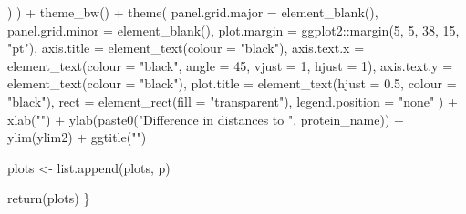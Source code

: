 \documentclass[
  11pt,
  oneside]{book}
\newenvironment{Shaded}{\begin{snugshade}}{\end{snugshade}}
\newcommand{\AttributeTok}[1]{\textcolor[rgb]{0.77,0.63,0.00}{#1}}
\newcommand{\DecValTok}[1]{\textcolor[rgb]{0.00,0.00,0.81}{#1}}
\newcommand{\FloatTok}[1]{\textcolor[rgb]{0.00,0.00,0.81}{#1}}
\newcommand{\FunctionTok}[1]{\textcolor[rgb]{0.00,0.00,0.00}{#1}}
\newcommand{\NormalTok}[1]{#1}
\newcommand{\OtherTok}[1]{\textcolor[rgb]{0.56,0.35,0.01}{#1}}
\newcommand{\SpecialCharTok}[1]{\textcolor[rgb]{0.00,0.00,0.00}{#1}}
\newcommand{\StringTok}[1]{\textcolor[rgb]{0.31,0.60,0.02}{#1}}
\begin{document}
\begin{Shaded}
\begin{Highlighting}[]
\NormalTok{      )}
\NormalTok{    ) }\SpecialCharTok{+}
    \FunctionTok{theme\_bw}\NormalTok{() }\SpecialCharTok{+}
    \FunctionTok{theme}\NormalTok{(}
      \AttributeTok{panel.grid.major =} \FunctionTok{element\_blank}\NormalTok{(),}
      \AttributeTok{panel.grid.minor =} \FunctionTok{element\_blank}\NormalTok{(),}
      \AttributeTok{plot.margin =}\NormalTok{ ggplot2}\SpecialCharTok{::}\FunctionTok{margin}\NormalTok{(}\DecValTok{5}\NormalTok{, }\DecValTok{5}\NormalTok{, }\DecValTok{38}\NormalTok{, }\DecValTok{15}\NormalTok{, }\StringTok{"pt"}\NormalTok{),}
      \AttributeTok{axis.title =} \FunctionTok{element\_text}\NormalTok{(}\AttributeTok{colour =} \StringTok{"black"}\NormalTok{),}
      \AttributeTok{axis.text.x =} \FunctionTok{element\_text}\NormalTok{(}\AttributeTok{colour =} \StringTok{"black"}\NormalTok{, }\AttributeTok{angle =} \DecValTok{45}\NormalTok{, }\AttributeTok{vjust =} \DecValTok{1}\NormalTok{, }\AttributeTok{hjust =} \DecValTok{1}\NormalTok{),}
      \AttributeTok{axis.text.y =} \FunctionTok{element\_text}\NormalTok{(}\AttributeTok{colour =} \StringTok{"black"}\NormalTok{),}
      \AttributeTok{plot.title =} \FunctionTok{element\_text}\NormalTok{(}\AttributeTok{hjust =} \FloatTok{0.5}\NormalTok{, }\AttributeTok{colour =} \StringTok{"black"}\NormalTok{),}
      \AttributeTok{rect =} \FunctionTok{element\_rect}\NormalTok{(}\AttributeTok{fill =} \StringTok{"transparent"}\NormalTok{),}
      \AttributeTok{legend.position =} \StringTok{"none"}
\NormalTok{    ) }\SpecialCharTok{+}
    \FunctionTok{xlab}\NormalTok{(}\StringTok{""}\NormalTok{) }\SpecialCharTok{+}
    \FunctionTok{ylab}\NormalTok{(}\FunctionTok{paste0}\NormalTok{(}\StringTok{"Difference in distances to "}\NormalTok{, protein\_name)) }\SpecialCharTok{+}
    \FunctionTok{ylim}\NormalTok{(ylim2) }\SpecialCharTok{+}
    \FunctionTok{ggtitle}\NormalTok{(}\StringTok{""}\NormalTok{)}

\NormalTok{  plots }\OtherTok{\textless{}{-}} \FunctionTok{list.append}\NormalTok{(plots, p)}

  \FunctionTok{return}\NormalTok{(plots)}
\NormalTok{\}}
\end{Highlighting}
\end{Shaded}
\end{document}
